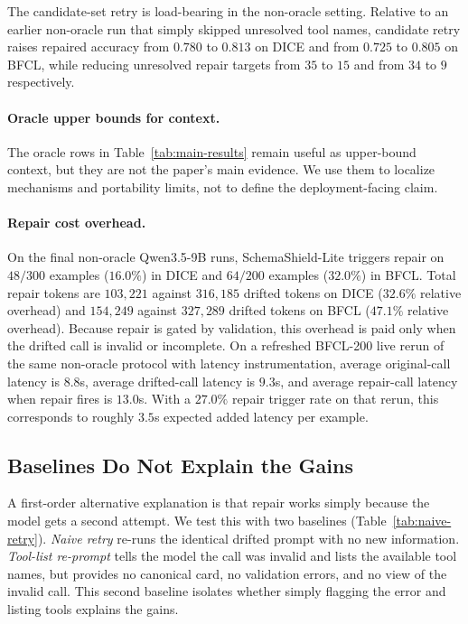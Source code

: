 \documentclass[runningheads]{llncs}
\newcommand{\method}{SchemaShield-Lite\xspace}
\begin{document}
The candidate-set retry is load-bearing in the non-oracle setting. Relative to an
earlier non-oracle run that simply skipped unresolved tool names, candidate retry
raises repaired accuracy from $0.780$ to $0.813$ on DICE and from $0.725$ to
$0.805$ on BFCL, while reducing unresolved repair targets from $35$ to $15$ and
from $34$ to $9$ respectively.

\paragraph{Oracle upper bounds for context.}
The oracle rows in Table~\ref{tab:main-results} remain useful as upper-bound
context, but they are not the paper's main evidence. We use them to localize
mechanisms and portability limits, not to define the deployment-facing claim.

\paragraph{Repair cost overhead.}
On the final non-oracle Qwen3.5-9B runs, \method triggers repair on $48/300$
examples ($16.0\%$) in DICE and $64/200$ examples ($32.0\%$) in BFCL. Total repair
tokens are $103{,}221$ against $316{,}185$ drifted tokens on DICE ($32.6\%$
relative overhead) and $154{,}249$ against $327{,}289$ drifted tokens on BFCL
($47.1\%$ relative overhead). Because repair is gated by validation, this overhead
is paid only when the drifted call is invalid or incomplete. On a refreshed
BFCL-200 live rerun of the same non-oracle protocol with latency instrumentation,
average original-call latency is $8.8$s, average drifted-call latency is $9.3$s,
and average repair-call latency when repair fires is $13.0$s. With a $27.0\%$
repair trigger rate on that rerun, this corresponds to roughly $3.5$s expected
added latency per example.

\subsection{Baselines Do Not Explain the Gains}
\label{sec:naive-retry}
A first-order alternative explanation is that repair works simply because the model
gets a second attempt. We test this with two baselines
(Table~\ref{tab:naive-retry}). \emph{Naive retry} re-runs the identical drifted
prompt with no new information. \emph{Tool-list re-prompt} tells the model the
call was invalid and lists the available tool names, but provides no canonical
card, no validation errors, and no view of the invalid call. This second baseline
isolates whether simply flagging the error and listing tools explains the gains.
\end{document}
